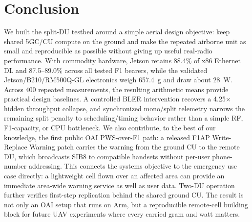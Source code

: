 \documentclass[conference]{IEEEtran}
\begin{document}
\section{Conclusion}
We built the split-DU testbed around a simple aerial design objective: keep
shared 5GC/CU compute on the ground and make the repeated airborne unit as
small and reproducible as possible without giving up useful real-radio
performance. With commodity hardware, Jetson retains 88.4\% of x86 Ethernet
DL and 87.5--89.0\% across all tested F1 bearers, while the validated
Jetson/B210/RM500Q-GL electronics weigh 657.4~g and draw about 28~W. Across
400 repeated measurements, the resulting arithmetic means provide practical
design baselines. A controlled BLER intervention
recovers a 4.25$\times$ hidden throughput collapse, and synchronized
mono/split telemetry narrows the remaining split penalty to scheduling/timing
behavior rather than a simple RF, F1-capacity, or CPU bottleneck. We also
contribute, to the best of our knowledge, the first public OAI PWS-over-F1
path: a released F1AP Write-Replace Warning patch carries the warning from the
ground CU to the remote DU, which broadcasts SIB8 to compatible handsets
without per-user phone-number addressing. This connects the systems objective
to the emergency use case directly: a lightweight cell flown over an affected
area can provide an immediate area-wide warning service as well as user data.
Two-DU operation further verifies first-step replication behind the shared
ground CU. The result is not only an OAI setup that runs on Arm, but a
reproducible remote-cell building block for future UAV experiments where every
carried gram and watt matters.

\balance


\end{document}
